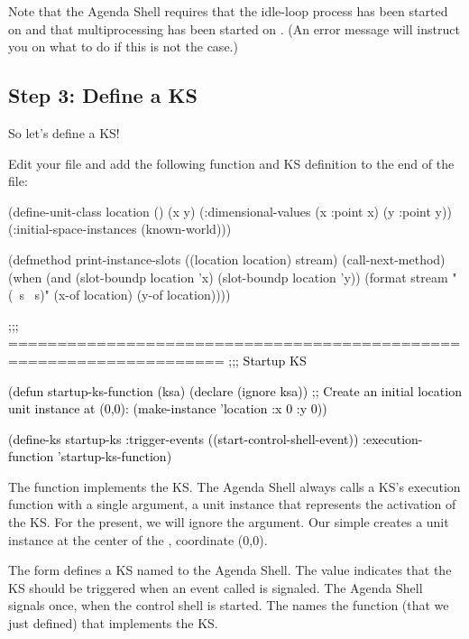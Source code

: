 \documentclass[10pt,twoside,english,pdftex]{article}
\begin{document}
Note that the Agenda Shell requires that the idle-loop process has been
started on  and that
multiprocessing has been started on
.  (An error message will
instruct you on what to do if this is not the case.)

\subsection*{Step 3: Define a KS}

So let's define a KS!

%
%
Edit your  file and add the following
function and KS definition to the end of the
 file:
%
\W\supp
\begin{example}
\textcolor{darkergray}{%
  (define-unit-class location ()
    (x y)
    (:dimensional-values
      (x :point x)
      (y :point y))
    (:initial-space-instances (known-world)))

  (defmethod print-instance-slots ((location location) stream)
    (call-next-method)
    (when (and (slot-boundp location 'x)
               (slot-boundp location 'y))
      (format stream " (~s ~s)"
              (x-of location)
              (y-of location))))

  \textcolor{black}{;;; ====================================================================
  ;;;   Startup KS

  (defun startup-ks-function (ksa)
    (declare (ignore ksa))
    ;; Create an initial location unit instance at (0,0):
    (make-instance 'location :x 0 :y 0))

  (define-ks startup-ks
      :trigger-events ((start-control-shell-event))
      :execution-function 'startup-ks-function)}}
\end{example}

The function  implements the KS.  The Agenda
Shell always calls a KS's execution function with a single argument, a
 unit instance that represents the activation of the KS.  For the
present, we will ignore the  argument.  Our simple
 creates a  unit
instance at the center of the , coordinate (0,0).

The  form defines a KS named 
to the Agenda Shell.  The  value indicates that
the KS should be triggered when an event called
 is signaled.  The Agenda Shell signals
 once, when the control shell is
started.  The  names the function (that we
just defined) that implements the KS.
\end{document}
